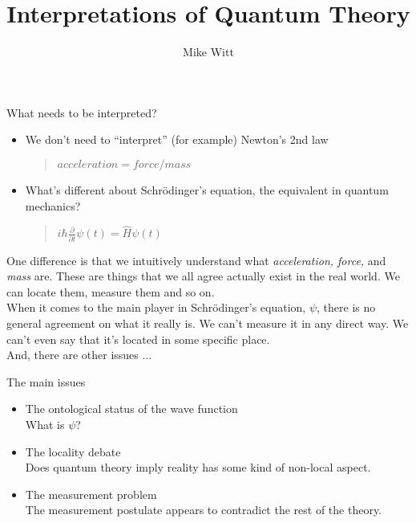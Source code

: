 \documentclass[9pt,usenames,dvipsnames]{beamer}
\author{Mike Witt}
\title{Interpretations of Quantum Theory}
\institute{Physics Cafe}
\begin{document}
\begin{frame}
\titlepage
\end{frame}


\begin{frame}[t]{What needs to be interpreted?}
\begin{itemize}
\vspace{8pt}
\item 
We don't need to ``interpret'' (for example) Newton's 2nd law
\begin{quote}
\vspace{8pt}
$acceleration = force / mass$
\end{quote}
\item
What's different about Schr\"odinger's equation, the equivalent
in quantum mechanics?
\begin{quote}
\vspace{8pt}
$i\hbar \frac{\partial}{\partial t}\psi(t) = \hat{H} \psi(t)$
\end{quote}
\end{itemize}

\vspace{2pt}
One difference is that we intuitively understand what 
{\it acceleration, force,} and {\it mass} are. These are things that we all
agree actually exist in the real world. We can locate them, measure them
and so on.
\vspace{12pt}\\
When it comes to the main player in Schr\"odinger's equation, $\psi$,
there is no general agreement on what it really is. We can't measure it in
any direct way. We can't even say that it's located in some specific place.
\vspace{12pt}\\
And, there are other issues ...
\end{frame}

\begin{frame}[t]{The main issues}
\begin{itemize}

\vspace{8pt}
\item 
The ontological status of the wave function
\vspace{6pt}\\
What is $\psi$?

\vspace{12pt}
\item
The locality debate
\vspace{6pt}\\
Does quantum theory imply reality has some kind of non-local aspect.

\vspace{12pt}
\item
The measurement problem
\vspace{6pt}\\
The measurement postulate appears to contradict the rest of the theory.
\end{itemize}
\end{frame}
\end{document}
